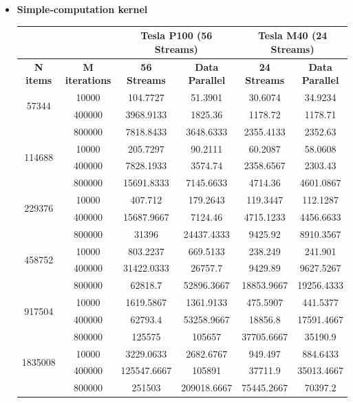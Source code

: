 \begin{itemize}
	\item \textbf{Simple-computation kernel}\\%
	\begin{table}
		\centering
		\begin{tabular}{ | c  c || c | c  || c | c | } 
			\hline
			& &  \multicolumn{2}{c||}{\textbf{Tesla P100 (56 Streams)}}& \multicolumn{2}{c|}{\textbf{Tesla M40 (24 Streams)}} \\ [0.5ex]
			\hline		
			\textbf{N items} &	\textbf{M iterations} &	\textbf{56 Streams} & \textbf{Data Parallel} &	\textbf{24 Streams} & \textbf{Data Parallel}\\
			\hline	\hline	
			
			\multirow{2}{*}{57344}&	10000&	104.7727&	51.3901&	30.6074&	34.9234\\
			&	400000&	3968.9133&	1825.36&	1178.72&	1178.71\\
			&	800000&	7818.8433&	3648.6333&	2355.4133&	2352.63\\
			\hline
			\multirow{2}{*}{114688}&	10000&	205.7297&	90.2111&	60.2087&	58.0608\\
			&	400000&	7828.1933&	3574.74&	2358.6567&	2303.43\\
			&	800000&	15691.8333&	7145.6633&	4714.36&	4601.0867\\
			\hline
			\multirow{2}{*}{229376}&	10000&	407.712&	179.2643&	119.3447&	112.1287\\
			&	400000&	15687.9667&	7124.46&	4715.1233&	4456.6633\\
			&	800000&	31396&	24437.4333&	9425.92&	8910.3567\\
			\hline
			\multirow{2}{*}{458752}&	10000&	803.2237&	669.5133&	238.249&	241.901\\
			&	400000&	31422.0333&	26757.7&	9429.89&	9627.5267\\
			&	800000&	62818.7&	52896.3667&	18853.9667&	19256.4333\\
			\hline
			\multirow{2}{*}{917504}&	10000&	1619.5867&	1361.9133&	475.5907&	441.5377\\
			&	400000&	62793.4&	53258.9667&	18856.8&	17591.4667\\
			&	800000&	125575&	105657&	37705.6667&	35190.9\\
			\hline
			\multirow{2}{*}{1835008}&	10000&	3229.0633&	2682.6767&	949.497&	884.6433\\
			&	400000&	125547.6667&	105891&	37711.9&	35013.4667\\
			&	800000&	251503&	209018.6667&	75445.2667&	70397.2\\


\end{tabular}
\end{table}
\end{itemize}
